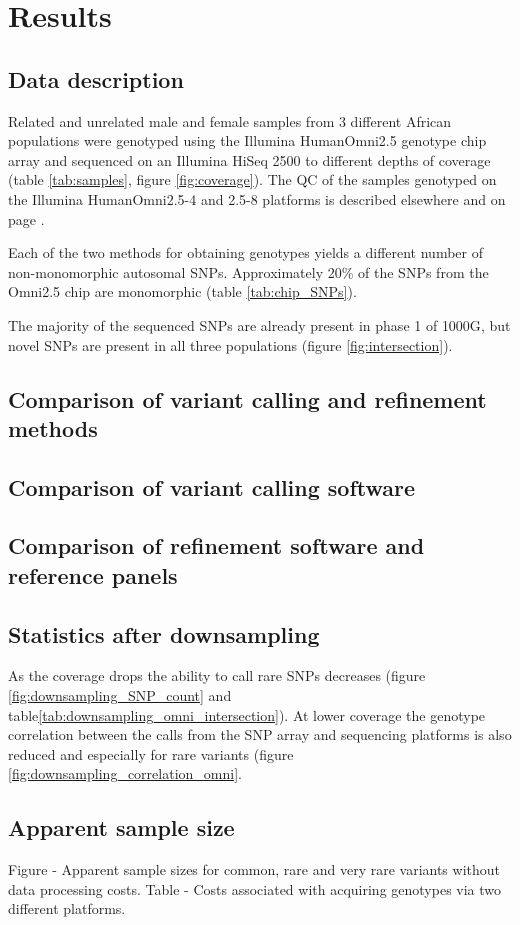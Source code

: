 \section{Results}

\subsection{Data description}
\label{sec:agv_data_description}
Related and unrelated male and female samples from 3 different African populations were genotyped using the Illumina HumanOmni2.5 genotype chip array and sequenced on an Illumina HiSeq 2500 to different depths of coverage (table \ref{tab:samples}, figure \ref{fig:coverage}). The \gls{QC} of the samples genotyped on the Illumina HumanOmni2.5-4 and 2.5-8 platforms is described elsewhere\cite{Gurdasani2015} and on page \pageref{subsec:chipQC}.

Each of the two methods for obtaining genotypes yields a different number of non-monomorphic autosomal SNPs. Approximately 20\% of the SNPs from the Omni2.5 chip are monomorphic (table \ref{tab:chip_SNPs}).

The majority of the sequenced \glspl{SNP} are already present in phase 1 of \gls{1000G}\cite{1000G2012}, but novel SNPs are present in all three populations (figure \ref{fig:intersection}).

\subsection{Comparison of variant calling and refinement methods}
\subsection{Comparison of variant calling software}
\subsection{Comparison of refinement software and reference panels}

\subsection{Statistics after downsampling}

As the coverage drops the ability to call rare \glspl{SNP} decreases (figure \ref{fig:downsampling_SNP_count} and table\ref{tab:downsampling_omni_intersection}). At lower coverage the genotype correlation between the calls from the SNP array and sequencing platforms is also reduced and especially for rare variants (figure \ref{fig:downsampling_correlation_omni}.








\subsection{Apparent sample size}

Figure - Apparent sample sizes for common, rare and very rare variants without data processing costs. 
Table - Costs associated with acquiring genotypes via two different platforms.